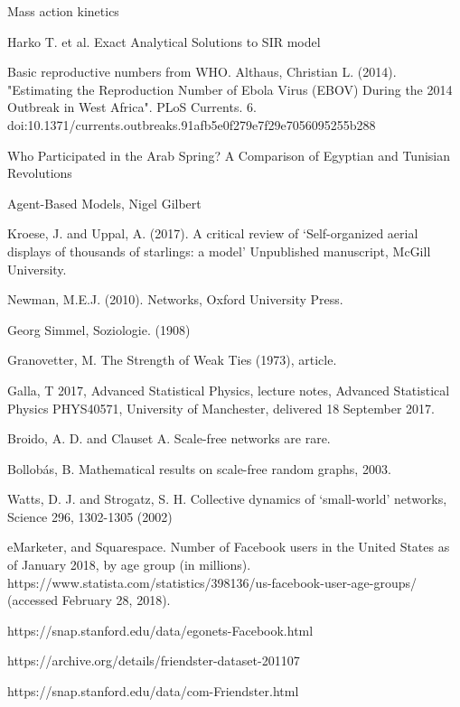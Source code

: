 \begin{thebibliography}{9}
	Mass action kinetics
	
	Harko T. et al. Exact Analytical Solutions to SIR model
	
	Basic reproductive numbers from WHO. Althaus, Christian L. (2014). "Estimating the Reproduction Number of Ebola Virus (EBOV) During the 2014 Outbreak in West Africa". PLoS Currents. 6. doi:10.1371/currents.outbreaks.91afb5e0f279e7f29e7056095255b288
	
	Who Participated in the Arab
	Spring? A Comparison of 
	Egyptian and Tunisian Revolutions 
	
	Agent-Based Models, Nigel Gilbert
	
	Kroese, J. and Uppal, A. (2017). A critical review of ‘Self-organized aerial displays of thousands of starlings: a model’ Unpublished manuscript, McGill University.
	
	Newman, M.E.J. (2010). Networks, Oxford University Press.
	
	Georg Simmel, Soziologie. (1908)
	
	Granovetter, M. The Strength of Weak Ties (1973), article.
	
	Galla, T 2017, Advanced Statistical Physics, lecture notes, Advanced Statistical Physics PHYS40571, University of Manchester, delivered 18 September 2017.
	
	Broido, A. D. and Clauset A. Scale-free networks are rare.
	
	Bollob\'as, B. Mathematical results on scale-free random graphs, 2003.
	
	Watts, D. J. and Strogatz, S. H. Collective dynamics of `small-world' networks, Science 296, 1302-1305 (2002)
	
	eMarketer, and Squarespace. Number of Facebook users in the United States as of January 2018, by age group (in millions). https://www.statista.com/statistics/398136/us-facebook-user-age-groups/ (accessed February 28, 2018). 
	
	https://snap.stanford.edu/data/egonets-Facebook.html
	
	https://archive.org/details/friendster-dataset-201107
	
	https://snap.stanford.edu/data/com-Friendster.html
	

\end{thebibliography}
